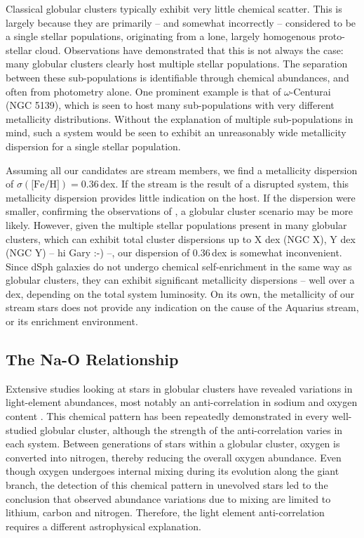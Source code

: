 \documentclass{emulateapj}
\begin{document}
Classical globular clusters typically exhibit very little chemical scatter. This is largely because they are primarily -- and somewhat incorrectly -- considered to be a single stellar populations, originating from a lone, largely homogenous proto-stellar cloud. Observations have demonstrated that this is not always the case: many globular clusters clearly host multiple stellar populations. The separation between these sub-populations is identifiable through chemical abundances, and often from photometry alone. One prominent example is that of $\omega$-Centurai (NGC 5139), which is seen to host many sub-populations with very different metallicity distributions. Without the explanation of multiple sub-populations in mind, such a system would be seen to exhibit an unreasonably wide metallicity dispersion for a single stellar population.

Assuming all our candidates are stream members, we find a metallicity dispersion of {$\sigma(\mbox{[Fe/H]}) = 0.36$\,dex}. If the stream is the result of a disrupted system, this metallicity dispersion provides little indication on the host. If the dispersion were smaller, confirming the observations of \citet{wylie-de-boer;et-al_2012}, a globular cluster scenario may be more likely. However, given the multiple stellar populations present in many globular clusters, which can exhibit total cluster dispersions up to X dex (NGC X), Y dex (NGC Y) -- hi Gary :-) --, our dispersion of 0.36\,dex is somewhat inconvenient. Since dSph galaxies do not undergo chemical self-enrichment in the same way as globular clusters, they can exhibit significant metallicity dispersions -- well over a dex, depending on the total system luminosity. On its own, the metallicity of our stream stars does not provide any indication on the cause of the Aquarius stream, or its enrichment environment.


\subsection{The Na-O Relationship}

Extensive studies looking at stars in globular clusters have revealed variations in light-element abundances, most notably an anti-correlation in sodium and oxygen content \citep[][and references therein]{norris;da_costa_1995,carretta;et-al_2009a}. This chemical pattern has been repeatedly demonstrated in every well-studied globular cluster, although the strength of the anti-correlation varies in each system. Between generations of stars within a globular cluster, oxygen is converted into nitrogen, thereby reducing the overall oxygen abundance. Even though oxygen undergoes internal mixing during its evolution along the giant branch, the detection of this chemical pattern in unevolved stars led to the conclusion that observed abundance variations due to mixing are limited to lithium, carbon and nitrogen. Therefore, the light element anti-correlation requires a different astrophysical explanation.
\end{document}
